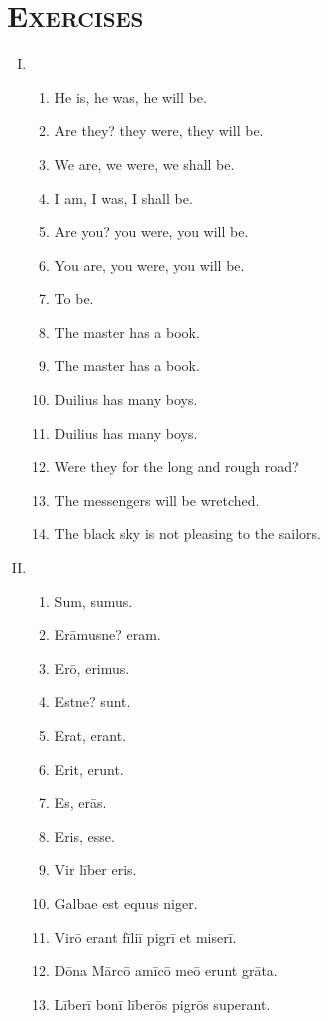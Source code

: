 \documentclass[12pt]{article}
\begin{document}
\section{\textsc{Exercises}}
\begin{enumerate}[I.]
	\setlength{\itemsep}{1em}
	\item \begin{enumerate}[1)]
		\item He is, he was, he will be.
		\item Are they? they were, they will be.
		\item We are, we were, we shall be.
		\item I am, I was, I shall be.
		\item Are you? you were, you will be.
		\item You are, you were, you will be.
		\item To be.
		\item The master has a book.
		\item The master has a book.
		\item Duilius has many boys.
		\item Duilius has many boys.
		\item Were they for the long and rough road?
		\item The messengers will be wretched.
		\item The black sky is not pleasing to the sailors.
	\end{enumerate}
	\item \begin{enumerate}[1)]
		\item Sum, sumus.
		\item Erāmusne? eram.
		\item Erō, erimus.
		\item Estne? sunt.
		\item Erat, erant.
		\item Erit, erunt.
		\item Es, erās.
		\item Eris, esse.
		\item Vir līber eris.
		\item Galbae est equus niger.
		\item Virō erant fīliī pigrī et miserī.
		\item Dōna Mārcō amīcō meō erunt grāta.
		\item Līberī bonī līberōs pigrōs superant.
	\end{enumerate}
\end{enumerate}
\end{document}
